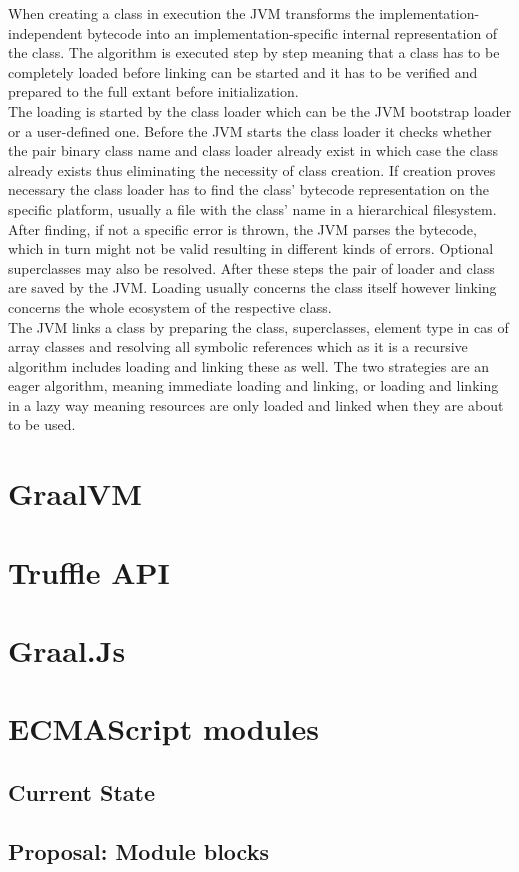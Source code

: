 When creating a class in execution the JVM transforms the implementation-independent bytecode into an implementation-specific internal representation of the class. The algorithm is executed step by step meaning that a class has to be completely loaded before linking can be started and it has to be verified and prepared to the full extant before initialization.\\
The loading is started by the class loader which can be the JVM bootstrap loader or a user-defined one. Before the JVM starts the class loader it checks whether the pair binary class name and class loader already exist in which case the class already exists thus eliminating the necessity of class creation. If creation proves necessary the class loader has to find the class' bytecode representation on the specific platform, usually a file with the class' name in a hierarchical filesystem. After finding, if not a specific error is thrown, the JVM parses the bytecode, which in turn might not be valid resulting in different kinds of errors. Optional superclasses may also be resolved. After these steps the pair of loader and class are saved by the JVM. Loading usually concerns the class itself however linking concerns the whole ecosystem of the respective class. \\
The JVM links a class by preparing the class, superclasses, element type in cas of array classes and resolving all symbolic references which as it is a recursive algorithm includes loading and linking these as well. The two strategies are an eager algorithm, meaning immediate loading and linking, or loading and linking in a lazy way meaning resources are only loaded and linked when they are about to be used.

\cite{Lindholm}


\section{GraalVM}

\section{Truffle API}

\section{Graal.Js}

\section{ECMAScript modules}
\subsection{Current State}

\subsection{Proposal: Module blocks}